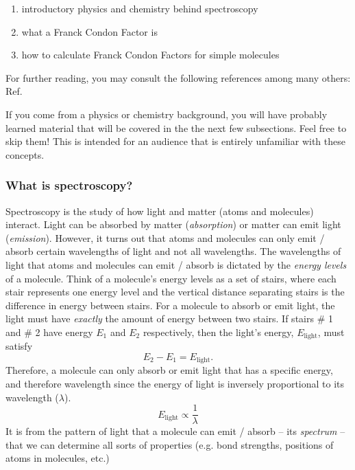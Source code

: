 \documentclass[12pt]{article}
\begin{document}
\begin{enumerate}
    \item introductory physics and chemistry behind spectroscopy
    \item what a Franck Condon Factor is
    \item how to calculate Franck Condon Factors for simple molecules
\end{enumerate}

For further reading, you may consult the following references among many others: Ref.~\cite{quesadaFranckCondonFactorsCounting2019,wrightFranckCondonFactorsTheir1999,fantzFranckCondonFactors2006}

If you come from a physics or chemistry background, you will have probably learned material that will be covered in the the next few subsections. Feel free to skip them! This is intended for an audience that is entirely unfamiliar with these concepts.

\subsubsection{What is spectroscopy?}

Spectroscopy is the study of how light and matter (atoms and molecules) interact. 
Light can be absorbed by matter (\textit{absorption}) or matter can emit light (\textit{emission}). 
However, it turns out that atoms and molecules can only emit / absorb certain wavelengths of light and not all wavelengths. 
The wavelengths of light that atoms and molecules can emit / absorb is dictated by the \textit{energy levels} of a molecule.
Think of a molecule's energy levels as a set of stairs, where each stair represents one energy level and the vertical distance separating stairs is the difference in energy between stairs. 
For a molecule to absorb or emit light, the light must have \textit{exactly} the amount of energy between two stairs. 
If stairs \# 1 and \# 2 have energy $E_1$ and $E_2$ respectively, then the light's energy, $E_{\text{light}}$, must satisfy
\begin{equation}
    E_2 - E_1 = E_{\text{light}}.
\end{equation}
Therefore, a molecule can only absorb or emit light that has a specific energy, and therefore wavelength since the energy of light is inversely proportional to its wavelength ($\lambda$).
\begin{equation}
    E_{\text{light}} \propto \frac{1}{\lambda}
\end{equation}
It is from the pattern of light that a molecule can emit / absorb -- its \textit{spectrum} -- that we can determine all sorts of properties (e.g. bond strengths, positions of atoms in molecules, etc.)
\end{document}
